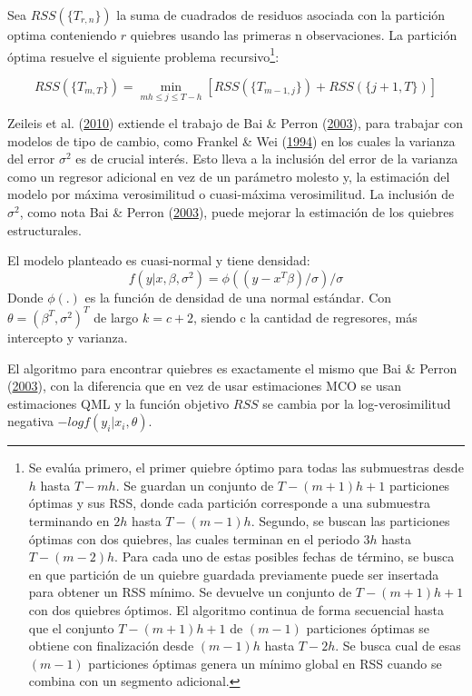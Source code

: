 \documentclass[12pt,oneside]{reedthesis}
\begin{document}
Sea \(RSS(\{T_{r,n}\})\) la suma de cuadrados de residuos asociada con la partición optima conteniendo \(r\) quiebres usando las primeras n observaciones. La partición óptima resuelve el siguiente problema recursivo\footnote{Se evalúa primero, el primer quiebre óptimo para todas las submuestras desde \(h\) hasta \(T-mh\). Se guardan un conjunto de \(T-(m+1)h+1\) particiones óptimas y sus RSS, donde cada partición corresponde a una submuestra terminando en \(2h\) hasta \(T-(m-1)h\).
  Segundo, se buscan las particiones óptimas con dos quiebres, las cuales terminan en el periodo \(3h\) hasta \(T-(m-2)h\). Para cada uno de estas posibles fechas de término, se busca en que partición de un quiebre guardada previamente puede ser insertada para obtener un RSS mínimo. Se devuelve un conjunto de \(T-(m+1)h+1\) con dos quiebres óptimos. El algoritmo continua de forma secuencial hasta que el conjunto \(T-(m+1)h+1\) de \((m-1)\) particiones óptimas se obtiene con finalización desde \((m-1)h\) hasta \(T-2h\). Se busca cual de esas \((m-1)\) particiones óptimas genera un mínimo global en RSS cuando se combina con un segmento adicional.}:

\[
RSS(\{T_{m,T}\}) = \min_{mh\leq j\leq T-h}[RSS(\{T_{m-1,j}\}) + RSS(\{j+1, T\})]
\]

Zeileis et al. (\protect\hyperlink{ref-Zeileis2010}{2010}) extiende el trabajo de Bai \& Perron (\protect\hyperlink{ref-BaiPerron2003}{2003}), para trabajar con modelos de tipo de cambio, como Frankel \& Wei (\protect\hyperlink{ref-Frankel1994}{1994}) en los cuales la varianza del error \(\sigma^2\) es de crucial interés. Esto lleva a la inclusión del error de la varianza como un regresor adicional en vez de un parámetro molesto y, la estimación del modelo por máxima verosimilitud o cuasi-máxima verosimilitud. La inclusión de \(\sigma^2\), como nota Bai \& Perron (\protect\hyperlink{ref-BaiPerron2003}{2003}), puede mejorar la estimación de los quiebres estructurales.

El modelo planteado es cuasi-normal y tiene densidad:
\[
f(y|x,\beta, \sigma^2) = \phi((y-x^T\beta)/\sigma)/\sigma
\]
Donde \(\phi(.)\) es la función de densidad de una normal estándar. Con \(\theta = (\beta^T, \sigma^2)^T\) de largo \(k = c +2\), siendo c la cantidad de regresores, más intercepto y varianza.

El algoritmo para encontrar quiebres es exactamente el mismo que Bai \& Perron (\protect\hyperlink{ref-BaiPerron2003}{2003}), con la diferencia que en vez de usar estimaciones MCO se usan estimaciones QML y la función objetivo \(RSS\) se cambia por la log-verosimilitud negativa \(-logf(y_i|x_i, \theta)\).
\end{document}
